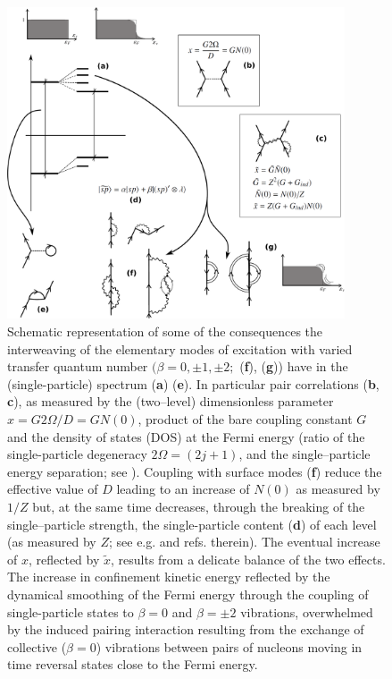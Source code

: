 \begin{figure}[h!]
\centerline {
\includegraphics*[width=10cm]{introduccion/figs/figintro6}
}
\caption[consequences the interweaving of the elementary modes of excitation with varied transfer quantum number $(\beta=0,\pm1,\pm2$.]{ Schematic representation of some of the consequences the interweaving of the elementary modes of excitation with varied transfer quantum number $(\beta=0,\pm1,\pm2;$  (\textbf{f}), (\textbf{g})) have in the (single-particle)  spectrum (\textbf{a}) (\textbf{e}). In particular pair correlations (\textbf{b}, \textbf{c}), as measured by the (two--level) dimensionless parameter $x=G2\Omega/D=GN(0)$, product of the bare coupling constant $G$ and the density of states (DOS) at the Fermi energy (ratio of the single-particle degeneracy $2\Omega=(2j+1)$, and the single--particle energy separation; see \cite{Hogassen:61,Broglia:68}). Coupling with surface modes (\textbf{f}) reduce the effective value of $D$ leading to an increase of $N(0)$ as measured by $1/Z$ but, at the same time decreases, through the breaking of the single--particle strength, the single-particle content (\textbf{d}) of each level (as measured by $Z$; see e.g. \cite{Barranco:05} and refs. therein). The eventual increase of $x$,  reflected by $\tilde x$, results from a delicate balance of the two effects. The increase in confinement kinetic energy reflected  by the dynamical smoothing of the Fermi energy through the coupling of single-particle states to $\beta=0$ and $\beta=\pm2$ vibrations, overwhelmed by the induced pairing interaction resulting from the exchange of collective ($\beta=0$) vibrations between pairs of nucleons moving in time reversal states close to the Fermi energy.}
\label{figintro6}
\end{figure}
